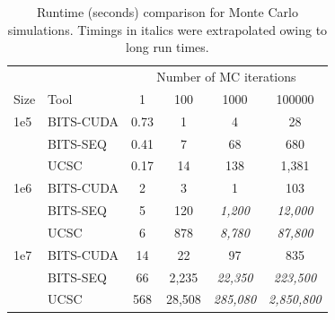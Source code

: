 \documentclass{bioinfo}
\begin{document}
\begin{center}
	\begin{table}[h!b!p!]
	\caption{Runtime (seconds) comparison for Monte Carlo simulations. 
	Timings in italics were extrapolated owing to long run times.}
	\begin{tabular}{l l c c c c}
	\multicolumn{2}{c}{} & \multicolumn{4}{c}{Number of MC iterations} \\
	\cline{3-6}
	Size & Tool & 1 & 100 & 1000 & 100000 \\
	\hline
	1e5 & BITS-CUDA & 0.73 & 1  & 4   & 28 \\
		& BITS-SEQ  & 0.41 & 7  & 68  & 680 \\
		& UCSC      & 0.17 & 14 & 138 & 1,381 \\
	1e6 & BITS-CUDA & 2 & 3    & 1       & 103 \\
		& BITS-SEQ  & 5 & 120  & \emph{1,200} & \emph{12,000} \\
		& UCSC      & 6 & 878  & \emph{8,780} & \emph{87,800} \\
	1e7 & BITS-CUDA & 14  & 22    & 97            & 835 \\
		& BITS-SEQ  & 66  & 2,235  & \emph{22,350}  & \emph{223,500} \\
		& UCSC      & 568 & 28,508 & \emph{285,080} & \emph{2,850,800} \\
	
	\hline
	\end{tabular}
	\label{table:avge}
	\end{table}
\end{center}
		

\end{document}
